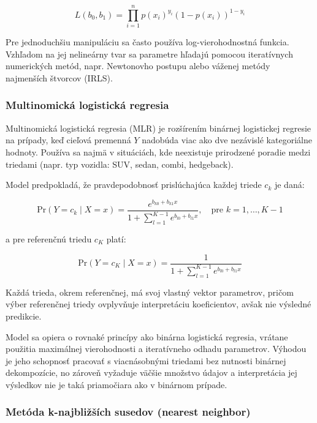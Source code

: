 \begin{equation}
L(b_0, b_1) = \prod_{i=1}^{n} p(x_i)^{y_i} (1 - p(x_i))^{1 - y_i}
\end{equation}

Pre jednoduchšiu manipuláciu sa často používa log-vierohodnostná funkcia. Vzhľadom na jej nelineárny tvar sa parametre hľadajú pomocou iteratívnych numerických metód, napr. Newtonovho postupu alebo váženej metódy najmenších štvorcov (IRLS).

\subsubsection{Multinomická logistická regresia}
\label{subsubsec:multinom_log_reg}

Multinomická logistická regresia (MLR) je rozšírením binárnej logistickej regresie na prípady, keď cieľová premenná $Y$ nadobúda viac ako dve nezávislé kategoriálne hodnoty. Používa sa najmä v situáciách, kde neexistuje prirodzené poradie medzi triedami (napr. typ vozidla: SUV, sedan, combi, hedgeback).

Model predpokladá, že pravdepodobnosť prislúchajúca každej triede $c_k$ je daná:

\begin{equation}
\mathrm{Pr}(Y = c_k \mid X = x) = \frac{e^{b_{k0} + b_{k1} x}}{1 + \sum\limits_{l=1}^{K-1} e^{b_{l0} + b_{l1} x}}, \quad \text{pre } k = 1, \dots, K-1
\end{equation}

a pre referenčnú triedu $c_K$ platí:

\begin{equation}
\mathrm{Pr}(Y = c_K \mid X = x) = \frac{1}{1 + \sum\limits_{l=1}^{K-1} e^{b_{l0} + b_{l1} x}}
\end{equation}

Každá trieda, okrem referenčnej, má svoj vlastný vektor parametrov, pričom výber referenčnej triedy ovplyvňuje interpretáciu koeficientov, avšak nie výsledné predikcie.

Model sa opiera o rovnaké princípy ako binárna logistická regresia, vrátane použitia maximálnej vierohodnosti a iteratívneho odhadu parametrov. Výhodou je jeho schopnosť pracovať s viacnásobnými triedami bez nutnosti binárnej dekompozície, no zároveň vyžaduje väčšie množstvo údajov a interpretácia jej výsledkov nie je taká priamočiara ako v binárnom prípade.

\subsubsection{Metóda k-najbližších susedov (nearest neighbor)}
\label{subsubsec:knn}

